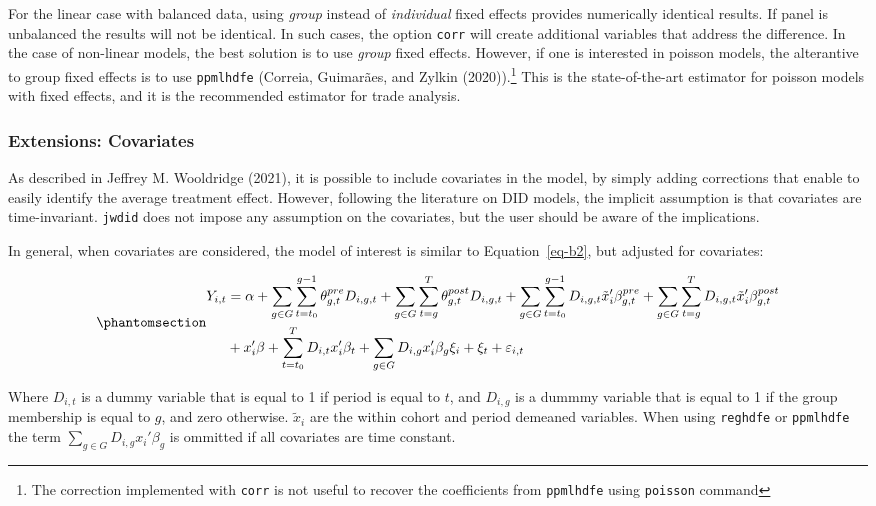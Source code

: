 \documentclass[
  letterpaper,
  DIV=11,
  numbers=noendperiod]{scrartcl}
\begin{document}
For the linear case with balanced data, using \emph{group} instead of
\emph{individual} fixed effects provides numerically identical results.
If panel is unbalanced the results will not be identical. In such cases,
the option \texttt{corr} will create additional variables that address
the difference. In the case of non-linear models, the best solution is
to use \emph{group} fixed effects. However, if one is interested in
poisson models, the alterantive to group fixed effects is to use
\texttt{ppmlhdfe} (Correia, Guimarães, and Zylkin (2020)).\footnote{ The
  correction implemented with \texttt{corr} is not useful to recover the
  coefficients from \texttt{ppmlhdfe} using \texttt{poisson} command}
This is the state-of-the-art estimator for poisson models with fixed
effects, and it is the recommended estimator for trade analysis.

\subsubsection{Extensions: Covariates}\label{sec-cov}

As described in Jeffrey M. Wooldridge (2021), it is possible to include
covariates in the model, by simply adding corrections that enable to
easily identify the average treatment effect. However, following the
literature on DID models, the implicit assumption is that covariates are
time-invariant. \texttt{jwdid} does not impose any assumption on the
covariates, but the user should be aware of the implications.

In general, when covariates are considered, the model of interest is
similar to Equation~\ref{eq-b2}, but adjusted for covariates:

\begin{equation}\phantomsection\label{eq-e2}{
\begin{aligned}
Y_{i,t} &= \alpha +  \sum_{g \in G} \sum_{t=t_0}^{g-1} \theta^{pre}_{g,t} D_{i,g,t}+
\sum_{g \in G} \sum_{t=g}^{T} \theta^{post}_{g,t} D_{i,g,t} + \sum_{g \in G} \sum_{t=t_0}^{g-1} D_{i,g,t} \tilde x_{i}'\beta^{pre}_{g,t} + 
\sum_{g \in G} \sum_{t=g}^{T} D_{i,g,t} \tilde x_{i}'\beta^{post}_{g,t} \\
&+ x_{i}'\beta + \sum_{t=t_0}^{T} D_{i,t} x_{i}'\beta_t + \sum_{g\in G} D_{i,g} x_{i}'\beta_g
\xi_i + \xi_t + \varepsilon_{i,t}
\end{aligned}}\end{equation}

Where \(D_{i,t}\) is a dummy variable that is equal to 1 if period is
equal to \(t\), and \(D_{i,g}\) is a dummmy variable that is equal to 1
if the group membership is equal to \(g\), and zero otherwise.
\(\tilde x_{i}\) are the within cohort and period demeaned variables.
When using \texttt{reghdfe} or \texttt{ppmlhdfe} the term
\(\sum_{g\in G} D_{i,g} x_{i}'\beta_g\) is ommitted if all covariates
are time constant.
\end{document}

